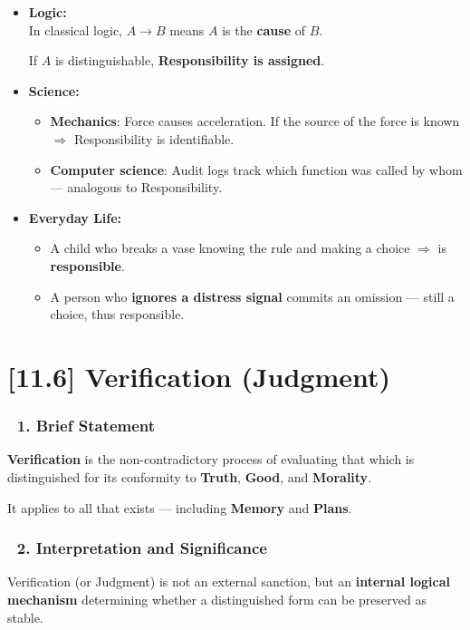\documentclass[12pt]{article}
\begin{document}
\begin{itemize}
\item \textbf{Logic:} \\
In classical logic, $A \rightarrow B$ means $A$ is the \textbf{cause} of $B$.

If $A$ is distinguishable, \textbf{Responsibility is assigned}.
\item \textbf{Science:}
\begin{itemize}
\item \textbf{Mechanics}: Force causes acceleration. If the source of the force is known $\Rightarrow$ Responsibility is identifiable.
\item \textbf{Computer science}: Audit logs track which function was called by whom — analogous to Responsibility.
\end{itemize}
\item \textbf{Everyday Life:}
\begin{itemize}
\item A child who breaks a vase knowing the rule and making a choice $\Rightarrow$ is \textbf{responsible}.
\item A person who \textbf{ignores a distress signal} commits an omission — still a choice, thus responsible.
\end{itemize}
\end{itemize}


\section*{[11.6] Verification (Judgment)}

\subsubsection*{🔹 1. Brief Statement}

\textbf{Verification} is the non-contradictory process of evaluating that which is distinguished for its conformity to \textbf{Truth}, \textbf{Good}, and \textbf{Morality}.

It applies to all that exists — including \textbf{Memory} and \textbf{Plans}.

\subsubsection*{🔹 2. Interpretation and Significance}

Verification (or Judgment) is not an external sanction, but an \textbf{internal logical mechanism} determining whether a distinguished form can be preserved as stable.
\end{document}
